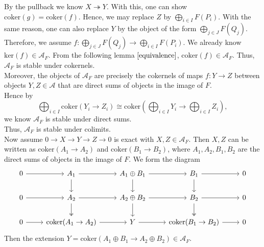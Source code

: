 \documentclass[UTF8,12,a4paper]{ctexart}
\theoremstyle{definition}
\begin{document}
By the pullback we know $X\twoheadrightarrow Y$. With this, one can show $\text{coker}(g)=\text{coker}(f)$. Hence, we may replace $Z$ by $\bigoplus_{i\in I} F(P_i)$. With the same reason, one can also replace $Y$ by the object of the form $\bigoplus_{j\in J} F(Q_j)$. Therefore, we assume $f:\bigoplus_{j\in J} F(Q_j)\rightarrow \bigoplus_{i\in I} F(P_i).$ We already know $\text{ker}(f)\in\mathcal{A}_F$. From the following lemma $\ref{equivalence}$, $\text{coker}(f)\in\mathcal{A}_F$. Thus, $\mathcal{A}_F$ is stable under cokernels.\\
Moreover, the objects of $\mathcal{A}_F$ are precisely the cokernels of maps $f: Y\rightarrow Z$ between objects $Y,Z\in\mathcal{A}$ that are direct sums of objects in the image of $F$. \\
Hence by
$$
\bigoplus_{i\in I} \text{coker}(Y_i\rightarrow Z_i)\cong 
\text{coker}(\bigoplus_{i\in I}Y_i\rightarrow \bigoplus_{i\in I}Z_i),
$$
we know $\mathcal{A}_F$ is stable under direct sums.\\
Thus, $\mathcal{A}_F$ is stable under colimits.\\
Now assume $0\rightarrow X\rightarrow Y\rightarrow Z\rightarrow 0$ is exact with $X, Z\in\mathcal{A}_F$. Then $X, Z$ can be written as $\text{coker}(A_1\rightarrow A_2)$ and $\text{coker}(B_1\rightarrow B_2)$, where $A_1,A_2,B_1,B_2$ are the direct sums of objects in the image of $F$. We form the diagram
$$
\begin{tikzcd}
0 \arrow[r] & A_1 \arrow[d] \arrow[r]                    & A_1\oplus B_1 \arrow[d] \arrow[r] & B_1 \arrow[d] \arrow[r]                    & 0 \\
0 \arrow[r] & A_2 \arrow[r] \arrow[d, two heads]         & A_2\oplus B_2 \arrow[r] \arrow[d] & B_2 \arrow[r] \arrow[d, two heads]         & 0 \\
0 \arrow[r] & \text{coker}(A_1\rightarrow A_2) \arrow[r] & Y \arrow[r]                       & \text{coker}(B_1\rightarrow B_2) \arrow[r] & 0
\end{tikzcd}
$$
Then the extension $Y=\text{coker}(A_1\oplus B_1\rightarrow A_2\oplus B_2)\in\mathcal{A}_F$.
\end{document}
